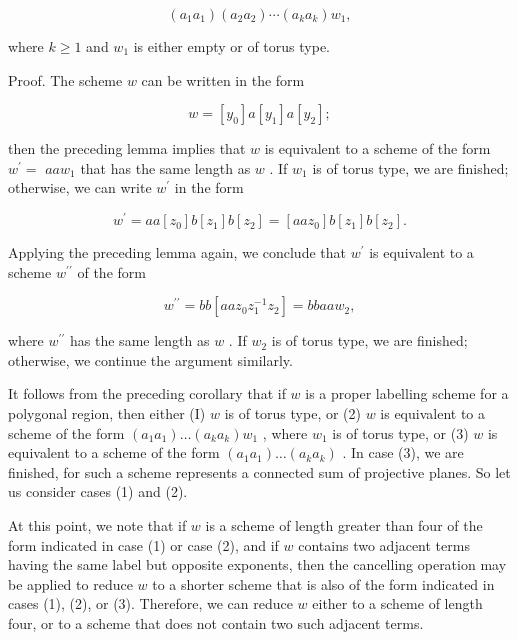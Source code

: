 \[
\left( {{a}_{1}{a}_{1}}\right) \left( {{a}_{2}{a}_{2}}\right) \cdots \left( {{a}_{k}{a}_{k}}\right) {w}_{1},
\]

where \(k \geq  1\) and \({w}_{1}\) is either empty or of torus type.

Proof. The scheme \(w\) can be written in the form

\[
w = \left\lbrack  {y}_{0}\right\rbrack  a\left\lbrack  {y}_{1}\right\rbrack  a\left\lbrack  {y}_{2}\right\rbrack  ;
\]

then the preceding lemma implies that \(w\) is equivalent to a scheme of the form \({w}^{\prime } =\)  \({aa}{w}_{1}\) that has the same length as \(w\) . If \({w}_{1}\) is of torus type, we are finished; otherwise, we can write \({w}^{\prime }\) in the form

\[
{w}^{\prime } = {aa}\left\lbrack  {z}_{0}\right\rbrack  b\left\lbrack  {z}_{1}\right\rbrack  b\left\lbrack  {z}_{2}\right\rbrack   = \left\lbrack  {{aa}{z}_{0}}\right\rbrack  b\left\lbrack  {z}_{1}\right\rbrack  b\left\lbrack  {z}_{2}\right\rbrack  .
\]

Applying the preceding lemma again, we conclude that \({w}^{\prime }\) is equivalent to a scheme \({w}^{\prime \prime }\) of the form

\[
{w}^{\prime \prime } = {bb}\left\lbrack  {{aa}{z}_{0}{z}_{1}^{-1}{z}_{2}}\right\rbrack   = {bbaa}{w}_{2},
\]

where \({w}^{\prime \prime }\) has the same length as \(w\) . If \({w}_{2}\) is of torus type, we are finished; otherwise, we continue the argument similarly.

It follows from the preceding corollary that if \(w\) is a proper labelling scheme for a polygonal region, then either (I) \(w\) is of torus type, or (2) \(w\) is equivalent to a scheme of the form \(\left( {{a}_{1}{a}_{1}}\right) \ldots \left( {{a}_{k}{a}_{k}}\right) {w}_{1}\) , where \({w}_{1}\) is of torus type, or (3) \(w\) is equivalent to a scheme of the form \(\left( {{a}_{1}{a}_{1}}\right) \ldots \left( {{a}_{k}{a}_{k}}\right)\) . In case (3), we are finished, for such a scheme represents a connected sum of projective planes. So let us consider cases (1) and (2).

At this point, we note that if \(w\) is a scheme of length greater than four of the form indicated in case (1) or case (2), and if \(w\) contains two adjacent terms having the same label but opposite exponents, then the cancelling operation may be applied to reduce \(w\) to a shorter scheme that is also of the form indicated in cases (1), (2), or (3). Therefore, we can reduce \(w\) either to a scheme of length four, or to a scheme that does not contain two such adjacent terms.

